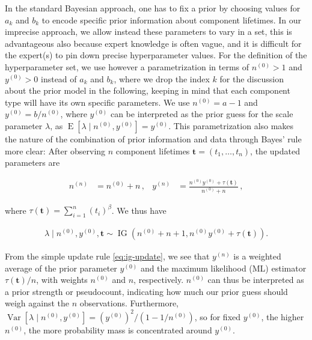 \documentclass[Journal,SectionNumbers,SingleSpace,InsideFigs]{ascelike}
\renewcommand{\vec}[1]{{\bm#1}}
\newcommand{\uz}{^{(0)}} %
\newcommand{\un}{^{(n)}} %
\newcommand{\E}{\operatorname{E}}
\newcommand{\V}{\operatorname{Var}}
\newcommand{\ig}{\operatorname{IG}}   %
\def\yz{y\uz}
\def\yn{y\un}
\def\ykz{y\uz_k}
\def\nz{n\uz}
\def\nn{n\un}
\def\nkz{n\uz_k}
\def\taut{\tau(\vec{t})}
\begin{document}
In the standard Bayesian approach, 
one has to fix a prior by choosing values for $a_k$ and $b_k$
to encode specific prior information about component lifetimes.
In our imprecise approach, we allow instead these parameters
to vary in a set, this is advantageous also
because expert knowledge is often vague,
and it is difficult for the expert(s) to pin down precise hyperparameter values.
For the definition of the hyperparameter set,
we use however a parametrization in terms of $\nz > 1$ and $\yz > 0$ instead of $a_k$ and $b_k$,
where we drop the index $k$ for the discussion about the prior model in the following,
keeping in mind that each component type will have its own specific parameters.
We use
$\nz = a - 1$ and
$\yz = b / \nz$,
where $\yz$ can be interpreted as the prior guess for the scale parameter $\lambda$,
as $\E[\lambda\mid\nz,\yz] = \yz$.
This parametrization also makes the nature of the combination
of prior information and data through Bayes' rule more clear:
After observing $n$ component lifetimes $\vec{t} = (t_1, \ldots, t_n)$,
the updated parameters are
\begin{linenomath*}
\begin{align}
\nn &= \nz + n\,, 
&
\yn &=  \frac{\nz \yz + \taut}{\nz + n}\,,
\label{eq:ig-update}
\end{align}
\end{linenomath*}
where $\taut = \sum_{i=1}^n (t_i)^\beta$. %
We thus have
\begin{linenomath*}
\begin{align}
\lambda \mid \nz, \yz, \vec{t} \sim \ig(\nz + n + 1, \nz \yz + \taut). %
\label{eq:ig-update-alpha}
\end{align}
\end{linenomath*}
From the simple update rule \eqref{eq:ig-update}, we see that
$\yn$ is a weighted average of the prior parameter $\yz$ and the maximum likelihood (ML) estimator $\taut/n$,
with weights $\nz$ and $n$, respectively.
$\nz$ can thus be interpreted as a prior strength or pseudocount,
indicating how much our prior guess should weigh against the $n$ observations.
Furthermore, $\V[\lambda\mid\nz,\yz] = (\yz)^2 / (1 - 1/\nz)$,
so for fixed $\yz$, the higher $\nz$,
the more probability mass is concentrated around $\yz$. %
\end{document}
